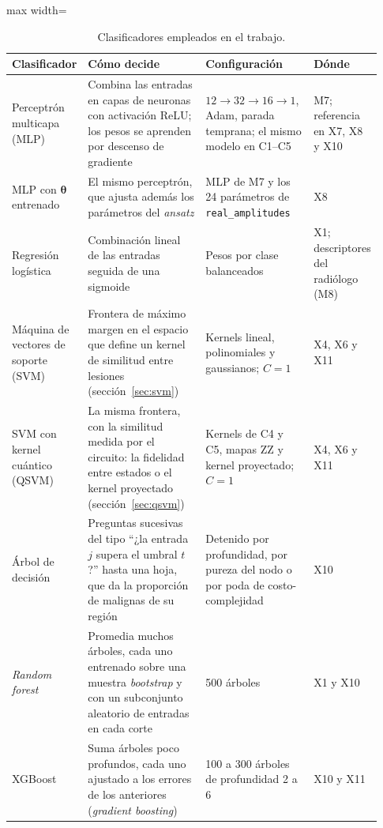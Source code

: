 \begin{table}[htbp]
\centering
\small
\caption{Clasificadores empleados en el trabajo.}
\label{tab:clasificadores}
\begin{adjustbox}{max width=\linewidth}
\begin{tabular}{p{0.17\linewidth} p{0.33\linewidth} p{0.3\linewidth} p{0.13\linewidth}}
\toprule
\textbf{Clasificador} & \textbf{Cómo decide} & \textbf{Configuración} & \textbf{Dónde} \\
\midrule
Perceptrón multicapa (MLP) & Combina las entradas en capas de neuronas con activación ReLU; los pesos se aprenden por descenso de gradiente & $12 \to 32 \to 16 \to 1$, Adam, parada temprana; el mismo modelo en C1--C5 & M7; referencia en X7, X8 y X10 \\
MLP con $\boldsymbol\theta$ entrenado & El mismo perceptrón, que ajusta además los parámetros del \textit{ansatz} & MLP de M7 y los 24 parámetros de \texttt{real\_amplitudes} & X8 \\
Regresión logística & Combinación lineal de las entradas seguida de una sigmoide & Pesos por clase balanceados & X1; descriptores del radiólogo (M8) \\
Máquina de vectores de soporte (SVM) & Frontera de máximo margen en el espacio que define un kernel de similitud entre lesiones (sección~\ref{sec:svm}) & Kernels lineal, polinomiales y gaussianos; $C = 1$ & X4, X6 y X11 \\
SVM con kernel cuántico (QSVM) & La misma frontera, con la similitud medida por el circuito: la fidelidad entre estados o el kernel proyectado (sección~\ref{sec:qsvm}) & Kernels de C4 y C5, mapas ZZ y kernel proyectado; $C = 1$ & X4, X6 y X11 \\
Árbol de decisión & Preguntas sucesivas del tipo ``¿la entrada $j$ supera el umbral $t$?'' hasta una hoja, que da la proporción de malignas de su región & Detenido por profundidad, por pureza del nodo o por poda de costo-complejidad & X10 \\
\textit{Random forest} & Promedia muchos árboles, cada uno entrenado sobre una muestra \textit{bootstrap} y con un subconjunto aleatorio de entradas en cada corte & 500 árboles & X1 y X10 \\
XGBoost & Suma árboles poco profundos, cada uno ajustado a los errores de los anteriores (\textit{gradient boosting}) & 100 a 300 árboles de profundidad 2 a 6 & X10 y X11 \\
\bottomrule
\end{tabular}
\end{adjustbox}
\end{table}
